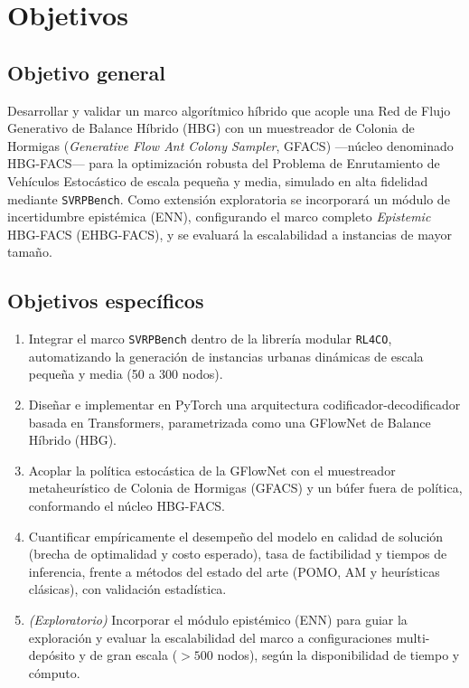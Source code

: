 \documentclass[12pt]{report}
\begin{document}
\section{Objetivos}\label{sec:objetivos}

\subsection*{Objetivo general}
Desarrollar y validar un marco algor\'itmico h\'ibrido que acople una Red de
Flujo Generativo de Balance H\'ibrido (HBG) con un muestreador de Colonia de
Hormigas (\textit{Generative Flow Ant Colony Sampler}, GFACS) ---n\'ucleo
denominado HBG-FACS--- para la optimizaci\'on robusta del Problema de
Enrutamiento de Veh\'iculos Estoc\'astico de escala peque\~na y media, simulado
en alta fidelidad mediante \texttt{SVRPBench}. Como extensi\'on exploratoria se
incorporar\'a un m\'odulo de incertidumbre epist\'emica (ENN), configurando el
marco completo \textit{Epistemic} HBG-FACS (EHBG-FACS), y se evaluar\'a la
escalabilidad a instancias de mayor tama\~no.

\subsection*{Objetivos espec\'ificos}
\begin{enumerate}[label=\textbf{OE\arabic*.},leftmargin=1.8cm,itemsep=0.5em]
  \item Integrar el marco \texttt{SVRPBench} dentro de la librer\'ia modular
  \texttt{RL4CO}, automatizando la generaci\'on de instancias urbanas din\'amicas
  de escala peque\~na y media (50 a 300 nodos).
  \item Dise\~nar e implementar en PyTorch una arquitectura
  codificador-decodificador basada en Transformers, parametrizada como una
  GFlowNet de Balance H\'ibrido (HBG).
  \item Acoplar la pol\'itica estoc\'astica de la GFlowNet con el muestreador
  metaheur\'istico de Colonia de Hormigas (GFACS) y un b\'ufer fuera de
  pol\'itica, conformando el n\'ucleo HBG-FACS.
  \item Cuantificar emp\'iricamente el desempe\~no del modelo en calidad de
  soluci\'on (brecha de optimalidad y costo esperado), tasa de factibilidad y
  tiempos de inferencia, frente a m\'etodos del estado del arte (POMO, AM y
  heur\'isticas cl\'asicas), con validaci\'on estad\'istica.
  \item \textit{(Exploratorio)} Incorporar el m\'odulo epist\'emico (ENN) para
  guiar la exploraci\'on y evaluar la escalabilidad del marco a configuraciones
  multi-dep\'osito y de gran escala ($>500$ nodos), seg\'un la disponibilidad de
  tiempo y c\'omputo.
\end{enumerate}
\end{document}
